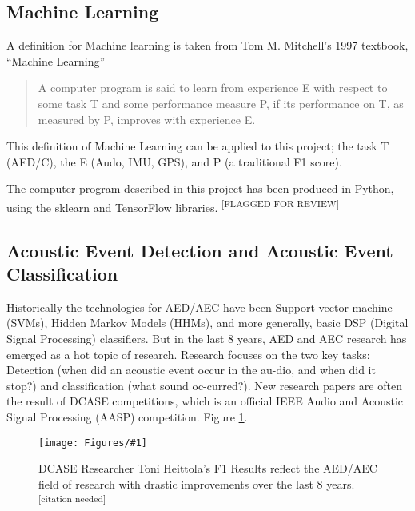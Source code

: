\documentclass{UoNMCHA}
\newcommand{\citationneeded}{\textsuperscript{\color{blue} [citation needed]}}
\newcommand{\flagforreview}{\textsuperscript{\color{red} [FLAGGED FOR REVIEW]}}
\newcommand{\inlineQuote}[1]{``#1''}
\newcommand{\fref}[1] {Figure \ref{#1}}
\newcommand{\fFigure}[3]{
	\begin{figure}[h]
        \begin{center}  
            \texttt{[image: Figures/\#1]}  
            \caption{#2}
            \label{#1}
        \end{center}
	\end{figure}
}
\numberwithin{equation}{section}
\begin{document}
\subsection{Machine Learning}
A definition for Machine learning is taken from Tom M. Mitchell's 1997 textbook, \inlineQuote{Machine Learning}
\begin{quote}
    A computer program is said to learn from experience E with respect to some task T and some performance measure P, if its performance on T, as measured by P, improves with experience E. \cite{Mitchell1997}
\end{quote}

This definition of Machine Learning can be applied to this project; the task T (AED/C), the E (Audo, IMU, GPS), and P (a traditional F1 score). 

The computer program described in this project has been produced in Python, using the sklearn and TensorFlow libraries. \flagforreview

\subsection{Acoustic Event Detection and Acoustic Event Classification}
Historically the technologies for AED/AEC have been Support vector machine (SVMs), Hidden Markov Models (HHMs), and more generally, basic DSP (Digital Signal Processing) classifiers. But in the last 8 years, AED and AEC research has emerged as a hot topic of research. Research focuses on the two key tasks: Detection (when did an acoustic event occur in the au-dio, and when did it stop?) and classification (what sound oc-curred?). New research papers are often the result of DCASE competitions, which is an official IEEE Audio and Acoustic Signal Processing (AASP) competition. \fref{F1_score.png}.

\fFigure{F1_score.png}{DCASE Researcher Toni Heittola's F1 Results reflect the AED/AEC field of research with drastic improvements over the last 8 years. \citationneeded}{0.8}
\end{document}
